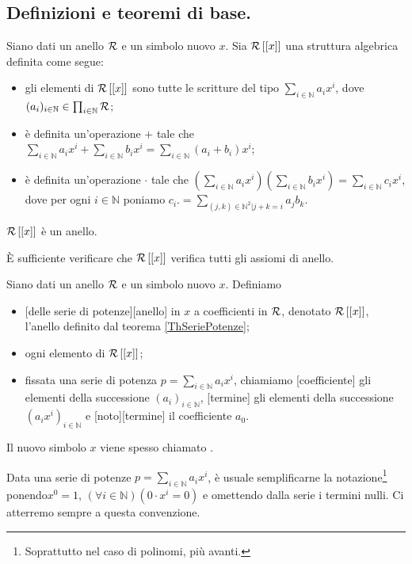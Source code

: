 \subsection{Definizioni e teoremi di base.}\label{SeriePotenzeEAnelliDiPolinomiDefinizioniETeoremiDiBase}
\begin{Theorem}\label{ThSeriePotenze}
	Siano dati un anello $\mathcal{R}$ e un simbolo nuovo $x$. Sia $\mathcal{R} \left [ \left [ x \right ] \right ]$ una struttura algebrica definita come segue:
	\begin{itemize}
		\item gli elementi di $\mathcal{R} \left [ \left [ x \right ] \right ]$ sono tutte le scritture del tipo $\sum_{i \in \mathbb{N}} a_ix^i$, dove $(a_i)_{i \in \mathbb{N}} \in \prod_{i \in \mathbb{N}} \mathcal{R}$;
		\item \`e definita un'operazione $+$ tale che $\sum_{i \in \mathbb{N}} a_ix^i + \sum_{i \in \mathbb{N}} b_ix^i = \sum_{i \in \mathbb{N}} (a_i + b_i) x^i$;
		\item \`e definita un'operazione $\cdot$ tale che $\left ( \sum_{i \in \mathbb{N}} a_ix^i \right ) \left ( \sum_{i \in \mathbb{N}} b_ix^i \right ) = \sum_{i \in \mathbb{N}} c_i x^i$, dove per ogni $i \in \mathbb{N}$ poniamo $c_i.= \sum_{(j,k) \in \mathbb{N}^2 | j + k = i} a_jb_k$.
	\end{itemize}
	$\mathcal{R} \left [ \left [ x \right ] \right ]$ \`e un anello.
\end{Theorem}
\Proof \`E sufficiente verificare che $\mathcal{R} \left [ \left [ x \right ] \right ]$ verifica tutti gli assiomi di anello. \EndProof
\begin{Definition}
	Siano dati un anello $\mathcal{R}$ e un simbolo nuovo $x$. Definiamo
	\begin{itemize}
		\item {}[delle serie di potenze][anello] in $x$ a coefficienti in $\mathcal{R}$, denotato $\mathcal{R} \left [ \left [ x \right ] \right ]$, l'anello definito dal teorema \ref{ThSeriePotenze};
		\item {} ogni elemento di $\mathcal{R} \left [ \left [ x \right ] \right ]$;
		\item fissata una serie di potenza $p = \sum_{i \in \mathbb{N}} a_ix^i$, chiamiamo [coefficiente] gli elementi della successione $(a_i)_{i \in \mathbb{N}}$, [termine] gli elementi della successione $(a_ix^i)_{i \in \mathbb{N}}$ e [termine] il coefficiente $a_0$.
	\end{itemize}
	Il nuovo simbolo $x$ viene spesso chiamato .
\end{Definition}
\par Data una serie di potenze $p = \sum_{i \in \mathbb{N}} a_i x^i$, \`e usuale semplificarne la notazione\footnote{Soprattutto nel caso di polinomi, \Cfr pi\`u avanti.} ponendo$x^0 = 1$, $(\forall i \in \mathbb{N})(0 \cdot x^i = 0)$ e omettendo dalla serie i termini nulli. Ci atterremo sempre a questa convenzione.
